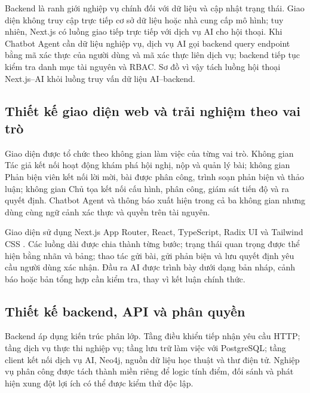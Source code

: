 Backend là ranh giới nghiệp vụ chính đối với dữ liệu và cập nhật trạng thái. Giao diện không truy cập trực tiếp cơ sở dữ liệu hoặc nhà cung cấp mô hình; tuy nhiên, Next.js có luồng giao tiếp trực tiếp với dịch vụ AI cho hội thoại. Khi Chatbot Agent cần dữ liệu nghiệp vụ, dịch vụ AI gọi backend query endpoint bằng mã xác thực của người dùng và mã xác thực liên dịch vụ; backend tiếp tục kiểm tra danh mục tài nguyên và RBAC. Sơ đồ vì vậy tách luồng hội thoại Next.js--AI khỏi luồng truy vấn dữ liệu AI--backend.

\subsection{Thiết kế giao diện web và trải nghiệm theo vai trò}
\label{subsec:ch3-web-cut}

Giao diện được tổ chức theo không gian làm việc của từng vai trò. Không gian Tác giả kết nối hoạt động khám phá hội nghị, nộp và quản lý bài; không gian Phản biện viên kết nối lời mời, bài được phân công, trình soạn phản biện và thảo luận; không gian Chủ tọa kết nối cấu hình, phân công, giám sát tiến độ và ra quyết định. Chatbot Agent và thông báo xuất hiện trong cả ba không gian nhưng dùng cùng ngữ cảnh xác thực và quyền trên tài nguyên.

Giao diện sử dụng Next.js App Router, React, TypeScript, Radix UI và Tailwind CSS \cite{ch3ref4,ch3ref5}. Các luồng dài được chia thành từng bước; trạng thái quan trọng được thể hiện bằng nhãn và bảng; thao tác gửi bài, gửi phản biện và lưu quyết định yêu cầu người dùng xác nhận. Đầu ra AI được trình bày dưới dạng bản nháp, cảnh báo hoặc bản tổng hợp cần kiểm tra, thay vì kết luận chính thức.

\subsection{Thiết kế backend, API và phân quyền}
\label{subsec:ch3-backend-cut}

Backend áp dụng kiến trúc phân lớp. Tầng điều khiển tiếp nhận yêu cầu HTTP; tầng dịch vụ thực thi nghiệp vụ; tầng lưu trữ làm việc với PostgreSQL; tầng client kết nối dịch vụ AI, Neo4j, nguồn dữ liệu học thuật và thư điện tử. Nghiệp vụ phân công được tách thành miền riêng để logic tính điểm, đối sánh và phát hiện xung đột lợi ích có thể được kiểm thử độc lập.

